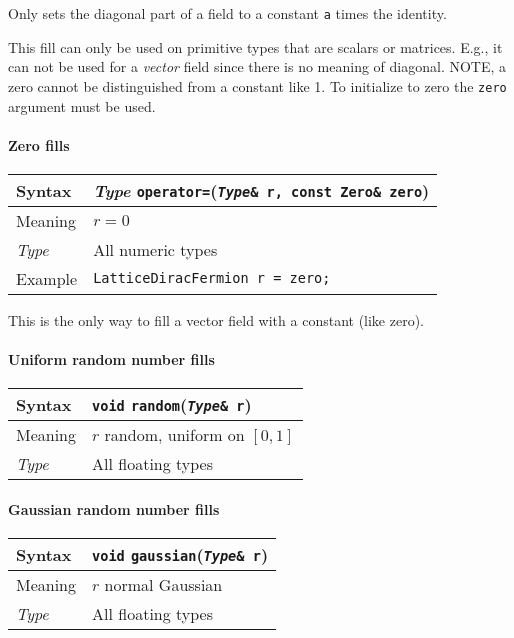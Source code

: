 \documentclass[12pt,letterpaper]{article}
\newcommand{\tLatticeDiracFermion}{LatticeDiracFermion}
\newcommand{\allNumericTypes}{All numeric types}
\newcommand{\allFloatTypes}{All floating types}
\newcommand{\itt}{\it Type}
\begin{document}
Only sets the diagonal part of a field to a constant \verb|a| times
the identity.

This fill can only be used on primitive types that are scalars or
matrices. E.g., it can not be used for a {\it vector} field since
there is no meaning of diagonal.  NOTE, a zero cannot be distinguished
from a constant like 1. To initialize to zero the \verb|zero| argument
must be used.

\paragraph{Zero fills}

\begin{flushleft}
  \begin{tabular}{|l|l|}
  \hline
  Syntax      & {\it Type} \verb|operator=|({\tt {\it Type}\& r, const Zero\& zero})\\
  \hline
  Meaning     & $r = 0$\\
  \hline
  \itt        & \allNumericTypes \\
  \hline
  Example     & {\tt \tLatticeDiracFermion{} r = zero;}\\
  \hline
  \end{tabular}
\end{flushleft}

This is the only way to fill a vector field with a constant (like zero).

\paragraph{Uniform random number fills}

\begin{flushleft}
  \begin{tabular}{|l|l|}
  \hline
  Syntax      & {\tt void} \verb|random|({\tt {\it Type}\& r}) \\
  \hline
  Meaning     & $r$ random, uniform on $[0,1]$ \\
  \hline
  \itt        & \allFloatTypes \\
  \hline
  \end{tabular}
\end{flushleft}

\paragraph{Gaussian random number fills}

\begin{flushleft}
  \begin{tabular}{|l|l|}
  \hline
  Syntax      & {\tt void} \verb|gaussian|({\tt {\it Type}\& r}) \\
  \hline
  Meaning     & $r$ normal Gaussian \\
  \hline
  \itt        & \allFloatTypes \\
  \hline
  \end{tabular}
\end{flushleft}
\end{document}

